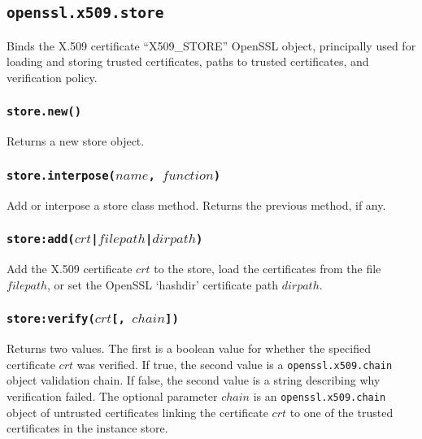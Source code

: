 \documentclass[11pt, oneside]{memoir}
\newcommand*{\fn}[1]{\texttt{#1}\xspace}
\newcommand*{\module}[1]{\texttt{#1}\xspace}
\newcounter{toccols}
\newenvironment{Module}[1]{
	\subsection{\texttt{#1}}
	\addtocontents{toc}{
		\protect\begin{multicols}{\value{toccols}}
	}
}{
	\addtocontents{toc}{\protect\end{multicols}}
}
\begin{document}
\begin{Module}{openssl.x509.store}

Binds the X.509 certificate ``X509\_STORE'' OpenSSL object, principally used for loading and storing trusted certificates, paths to trusted certificates, and verification policy.

\subsubsection[\fn{store.new}]{\fn{store.new()}}

Returns a new store object.

\subsubsection[\fn{store.interpose}]{\fn{store.interpose($name$, $function$)}}

Add or interpose a store class method. Returns the previous method, if any.

\subsubsection[\fn{store:add}]{\fn{store:add($crt$|$filepath$|$dirpath$)}}

Add the X.509 certificate $crt$ to the store, load the certificates from the file $filepath$, or set the OpenSSL `hashdir' certificate path $dirpath$.

\subsubsection[\fn{store:verify}]{\fn{store:verify($crt$[, $chain$])}}

Returns two values. The first is a boolean value for whether the specified certificate $crt$ was verified. If true, the second value is a \module{openssl.x509.chain} object validation chain. If false, the second value is a string describing why verification failed. The optional parameter $chain$ is an \module{openssl.x509.chain} object of untrusted certificates linking the certificate $crt$ to one of the trusted certificates in the instance store.

\end{Module}
\end{document}
